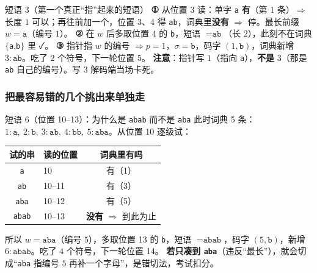 \documentclass[11pt,a4paper]{ctexart}
\begin{document}
\begin{calc}{短语 3（第一个真正“指”起来的短语）}
\textbf{①} 从位置 3 读：单字 \texttt a \textbf{有}（第 1 条）$\Rightarrow$ 长度 $1$ 可以；再往前加一个，位置 3、4 得 \texttt{ab}，词典里\textbf{没有} $\Rightarrow$ 停。最长前缀 $w=\texttt a$（编号 $1$）。
\textbf{②} 在 $w$ 后多取位置 4 的 \texttt b，短语 $=\texttt{ab}$（长 $2$），此刻不在词典 $\{$\texttt a,\texttt b$\}$ 里 ✓。
\textbf{③} 指针指 $w$ 的编号 $\Rightarrow p=1$，$\sigma=\texttt b$，码字 $(1,\texttt b)$，词典新增 $3{:}\texttt{ab}$。吃了 $2$ 个符号，下一轮位置 5。
\textbf{注意}：指针写 $1$（指向 \texttt a），\textbf{不是} $3$（那是 \texttt{ab} 自己的编号）。写 $3$ 解码端当场卡死。
\end{calc}

\subsubsection{把最容易错的几个挑出来单独走}

\begin{calc}{短语 6（位置 10--13）：为什么是 \texttt{abab} 而不是 \texttt{aba}}
此时词典 5 条：$1{:}\texttt a,\ 2{:}\texttt b,\ 3{:}\texttt{ab},\ 4{:}\texttt{bb},\ 5{:}\texttt{aba}$。从位置 10 逐级试：
\begin{center}
\small
\begin{tabular}{@{}c l c@{}}
\toprule
试的串 & 读的位置 & 词典里有吗 \\
\midrule
\texttt a & 10 & 有（1）\\
\texttt{ab} & 10--11 & 有（3）\\
\texttt{aba} & 10--12 & 有（5）\\
\texttt{abab} & 10--13 & \textbf{没有} $\Rightarrow$ 到此为止 \\
\bottomrule
\end{tabular}
\end{center}
所以 $w=\texttt{aba}$（编号 $5$），多取位置 13 的 \texttt b，短语 $=\texttt{abab}$，码字 $(5,\texttt b)$，新增 $6{:}\texttt{abab}$。吃了 $4$ 个符号，下一轮位置 14。
\textbf{若只凑到 \texttt{aba}}（违反“最长”），就会切成“\texttt{aba} 指编号 $5$ 再补一个字母”，是错切法，考试扣分。
\end{calc}
\end{document}
